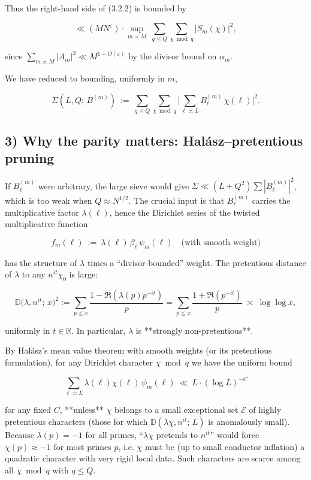 \documentclass[11pt]{article}
\theoremstyle{definition}
\theoremstyle{remark}
\begin{document}
Thus the right-hand side of (3.2.2) is bounded by

\begin{equation}
\ll (MN^\varepsilon)\cdot
\sup_{m\asymp M}\ \sum_{q\le Q}\sum_{\chi\bmod q}|S_m(\chi)|^2,
\tag{3.2.3}
\end{equation}

since $\sum_{m\asymp M}|A_m|^2\ll M^{1+O(\varepsilon)}$ by the divisor bound on $\alpha_m$.

We have reduced to bounding, uniformly in $m$,

\begin{equation}
\Sigma(L,Q;\,B^{(m)})\ :=\ \sum_{q\le Q}\sum_{\chi\bmod q}\Big|\sum_{\ell\asymp L} B_\ell^{(m)}\,\chi(\ell)\Big|^2.
\tag{3.2.4}
\end{equation}

\subsection*{3) Why the parity matters: Halász–pretentious pruning}

If $B_\ell^{(m)}$ were arbitrary, the large sieve would give $\Sigma\ll (L+Q^2)\sum|B_\ell^{(m)}|^2$, which is too weak when $Q\approx N^{1/2}$. The crucial input is that $B_\ell^{(m)}$ carries the multiplicative factor $\lambda(\ell)$, hence the Dirichlet series of the twisted multiplicative function

$$
f_m(\ell)\ :=\ \lambda(\ell)\,\beta_\ell\,\psi_m(\ell)\quad\text{(with smooth weight)}
$$

has the structure of $\lambda$ times a “divisor-bounded” weight. The pretentious distance of $\lambda$ to any $n^{it}\chi_0$ is large:

$$
\mathbb D\big(\lambda, n^{it};\,x\big)^2
:=\sum_{p\le x}\frac{1-\Re(\lambda(p)p^{-it})}{p}
=\sum_{p\le x}\frac{1+ \Re(p^{-it})}{p}
\ \asymp\ \log\log x,
$$

uniformly in $t\in\mathbb R$. In particular, $\lambda$ is **strongly non-pretentious**.

By Halász’s mean value theorem with smooth weights (or its pretentious formulation), for any Dirichlet character $\chi\bmod q$ we have the uniform bound

\begin{equation}
\sum_{\ell\asymp L} \lambda(\ell)\chi(\ell)\,\psi_m(\ell)\ \ll\ L\cdot (\log L)^{-C}
\tag{3.2.5}
\end{equation}

for any fixed $C$, **unless** $\chi$ belongs to a small exceptional set $\mathcal E$ of highly pretentious characters (those for which $\mathbb D(\lambda\chi, n^{it};\,L)$ is anomalously small). Because $\lambda(p)=-1$ for all primes, “$\lambda\chi$ pretends to $n^{it}$” would force $\chi(p)\approx -1$ for most primes $p$, i.e. $\chi$ must be (up to small conductor inflation) a quadratic character with very rigid local data. Such characters are scarce among all $\chi\bmod q$ with $q\le Q$.
\end{document}
